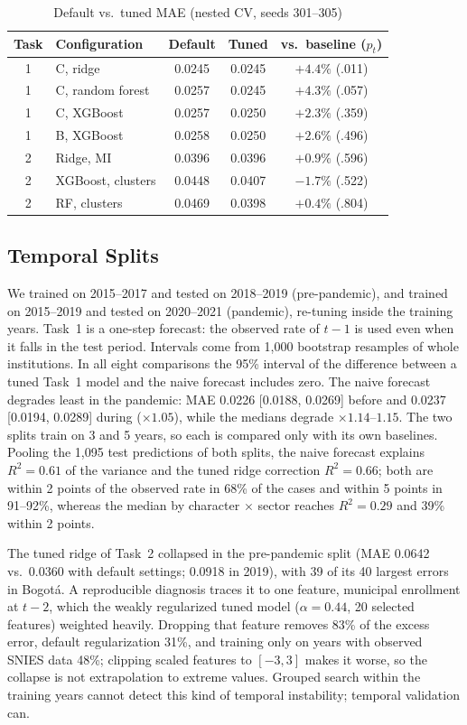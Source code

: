 \documentclass[conference]{IEEEtran}
\begin{document}
\begin{table}[!t]
\caption{Default vs.\ tuned MAE (nested CV, seeds 301--305)}
\label{tab:tune}
\centering\footnotesize
\setlength{\tabcolsep}{3pt}
\begin{tabular}{@{}clccc@{}}
\toprule
Task & Configuration & Default & Tuned & vs.\ baseline ($p_t$) \\
\midrule
1 & C, ridge & 0.0245 & 0.0245 & $+4.4\%$ (.011) \\
1 & C, random forest & 0.0257 & 0.0245 & $+4.3\%$ (.057) \\
1 & C, XGBoost & 0.0257 & 0.0250 & $+2.3\%$ (.359) \\
1 & B, XGBoost & 0.0258 & 0.0250 & $+2.6\%$ (.496) \\
2 & Ridge, MI & 0.0396 & 0.0396 & $+0.9\%$ (.596) \\
2 & XGBoost, clusters & 0.0448 & 0.0407 & $-1.7\%$ (.522) \\
2 & RF, clusters & 0.0469 & 0.0398 & $+0.4\%$ (.804) \\
\bottomrule
\end{tabular}
\end{table}

\subsection{Temporal Splits}
We trained on 2015--2017 and tested on 2018--2019 (pre-pandemic), and trained on 2015--2019 and tested on 2020--2021 (pandemic), re-tuning inside the training years. Task~1 is a one-step forecast: the observed rate of $t-1$ is used even when it falls in the test period. Intervals come from 1,000 bootstrap resamples of whole institutions. In all eight comparisons the 95\% interval of the difference between a tuned Task~1 model and the naive forecast includes zero. The naive forecast degrades least in the pandemic: MAE 0.0226 [0.0188, 0.0269] before and 0.0237 [0.0194, 0.0289] during ($\times1.05$), while the medians degrade $\times1.14$--$1.15$. The two splits train on 3 and 5 years, so each is compared only with its own baselines. Pooling the 1,095 test predictions of both splits, the naive forecast explains $R^2=0.61$ of the variance and the tuned ridge correction $R^2=0.66$; both are within 2 points of the observed rate in 68\% of the cases and within 5 points in 91--92\%, whereas the median by character $\times$ sector reaches $R^2=0.29$ and 39\% within 2 points.

The tuned ridge of Task~2 collapsed in the pre-pandemic split (MAE 0.0642 vs.\ 0.0360 with default settings; 0.0918 in 2019), with 39 of its 40 largest errors in Bogot\'a. A reproducible diagnosis traces it to one feature, municipal enrollment at $t-2$, which the weakly regularized tuned model ($\alpha=0.44$, 20 selected features) weighted heavily. Dropping that feature removes 83\% of the excess error, default regularization 31\%, and training only on years with observed SNIES data 48\%; clipping scaled features to $[-3,3]$ makes it worse, so the collapse is not extrapolation to extreme values. Grouped search within the training years cannot detect this kind of temporal instability; temporal validation can.
\end{document}
